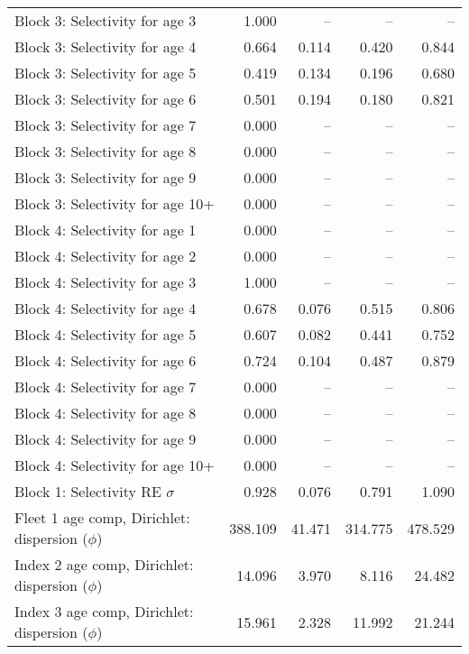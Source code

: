 \documentclass[
]{article}
\begin{document}
\begin{landscape}
\begin{longtable}[t]{lrrrr}
\addlinespace
Block 3: Selectivity for age 3 & 1.000 & -- & -- & --\\
Block 3: Selectivity for age 4 & 0.664 & 0.114 & 0.420 & 0.844\\
Block 3: Selectivity for age 5 & 0.419 & 0.134 & 0.196 & 0.680\\
Block 3: Selectivity for age 6 & 0.501 & 0.194 & 0.180 & 0.821\\
Block 3: Selectivity for age 7 & 0.000 & -- & -- & --\\
\addlinespace
Block 3: Selectivity for age 8 & 0.000 & -- & -- & --\\
Block 3: Selectivity for age 9 & 0.000 & -- & -- & --\\
Block 3: Selectivity for age 10+ & 0.000 & -- & -- & --\\
Block 4: Selectivity for age 1 & 0.000 & -- & -- & --\\
Block 4: Selectivity for age 2 & 0.000 & -- & -- & --\\
\addlinespace
Block 4: Selectivity for age 3 & 1.000 & -- & -- & --\\
Block 4: Selectivity for age 4 & 0.678 & 0.076 & 0.515 & 0.806\\
Block 4: Selectivity for age 5 & 0.607 & 0.082 & 0.441 & 0.752\\
Block 4: Selectivity for age 6 & 0.724 & 0.104 & 0.487 & 0.879\\
Block 4: Selectivity for age 7 & 0.000 & -- & -- & --\\
\addlinespace
Block 4: Selectivity for age 8 & 0.000 & -- & -- & --\\
Block 4: Selectivity for age 9 & 0.000 & -- & -- & --\\
Block 4: Selectivity for age 10+ & 0.000 & -- & -- & --\\
Block 1: Selectivity RE $\sigma$ & 0.928 & 0.076 & 0.791 & 1.090\\
Fleet 1 age comp, Dirichlet: dispersion ($\phi$) & 388.109 & 41.471 & 314.775 & 478.529\\
\addlinespace
Index 2 age comp, Dirichlet: dispersion ($\phi$) & 14.096 & 3.970 & 8.116 & 24.482\\
Index 3 age comp, Dirichlet: dispersion ($\phi$) & 15.961 & 2.328 & 11.992 & 21.244\\*
\end{longtable}
\end{landscape}
\end{document}
